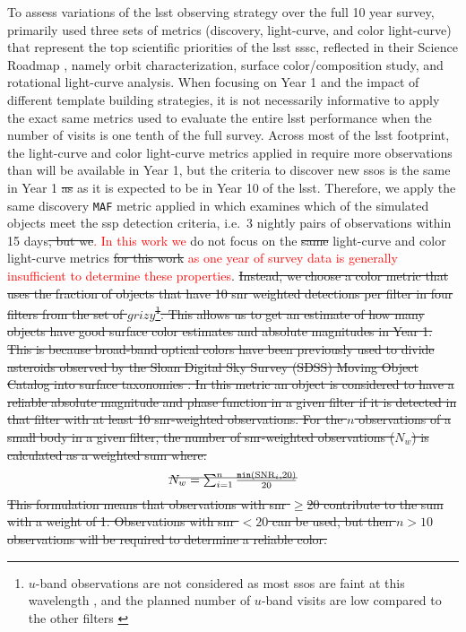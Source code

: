 \documentclass[preprintm,linenumbers]{aastex631}
\newcommand{\maf}{\texttt{MAF}\xspace}
\providecommand{\red}[1]{\textcolor{red}{#1}}
\begin{document}
To assess variations of the \gls*{lsst} observing strategy over the full 10 year survey, \cite{schwambTuningLegacySurvey2023} primarily used three sets of metrics (discovery, light-curve, and color light-curve) that represent the top scientific priorities of the \gls*{lsst} \gls*{sssc}, reflected in their Science Roadmap \citep{2018arXiv180201783S}, namely orbit characterization, surface color/composition study, and rotational light-curve analysis. 
When focusing on Year 1 and the impact of different template building strategies, it is not necessarily informative to apply the exact same metrics used to evaluate the entire \gls*{lsst} performance when the number of visits is one tenth of the full survey. 
Across most of the \gls*{lsst} footprint, the light-curve and color light-curve metrics applied in \cite{schwambTuningLegacySurvey2023} require more observations than will be available in Year 1, but the criteria to discover new \glspl*{sso} is the same in Year 1 \sout{as} as it is expected to be in Year 10 of the \gls*{lsst}. 
Therefore, we apply the same discovery \maf metric applied in \cite{schwambTuningLegacySurvey2023} which examines which of the simulated objects meet the \gls*{ssp} detection criteria, i.e.\ 3 nightly pairs of observations within 15 days\sout{, but we}\red{. In this work we} do not focus on the \sout{same} light-curve and color light-curve metrics \sout{for this work} \red{as one year of survey data is generally insufficient to determine these properties}. 
\sout{Instead, we choose a color metric that uses the fraction of objects that have 10 \gls*{snr} weighted detections per filter in four filters from the set of $grizy$\footnote{$u$-band observations are not considered as most \glspl*{sso} are faint at this wavelength \citep[e.g.;][]{2013Icar..226..723D,2008ssbn.book..181F}, and the planned number of $u$-band visits are low compared to the other filters \citep{SCOC_Report_3}}. 
This allows us to get an estimate of how many objects have good surface color estimates and absolute magnitudes in Year 1. 
This is because broad-band optical colors have been previously used to divide asteroids observed by the Sloan Digital Sky Survey (SDSS) Moving Object Catalog \citep{2001AJ....122.2749I,2002AJ....124.2943I,juricComparisonPositionsMagnitudes2002} into surface taxonomies \citep{2013Icar..226..723D,sergeyevMillionAsteroidObservations2021}. 
In this metric an object is considered to have a reliable absolute magnitude and phase function in a given filter if it is detected in that filter with at least 10 \gls*{snr}-weighted observations. 
For the $n$ observations of a small body in a given filter, the number of \gls*{snr}-weighted observations ($N_w$) is calculated as a weighted sum where:}
\begin{equation}
	\sout{$N_w =  \sum_{i=1}^n\frac{\texttt{min}(\mathrm{SNR}_i, 20)}{20}$}
\end{equation}
\sout{This formulation means that observations with \gls*{snr} $\ge$20 contribute to the sum with a weight of 1.
Observations with \gls*{snr} $<20$ can be used, but then $n>10$ observations will be required to determine a reliable color.}
\end{document}
